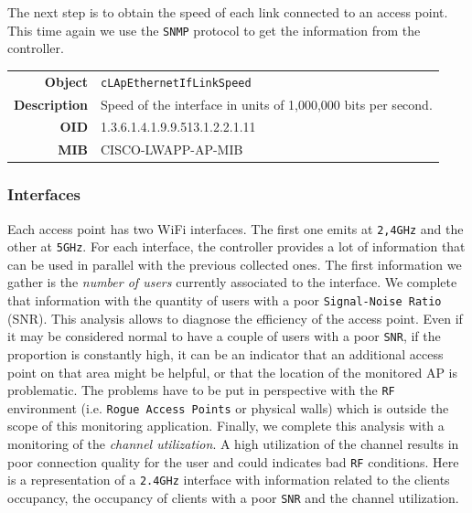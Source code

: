 The next step is to obtain the speed of each link connected to an access point. This time again we use the \texttt{SNMP} protocol to get the information from the controller.

\begin{tabular}{|r l|}
\hline
\textbf{Object} & \texttt{cLApEthernetIfLinkSpeed} \\
\textbf{Description} & \parbox{11cm}{Speed of the interface in units of 1,000,000 bits per second.} \\
\textbf{OID} & 1.3.6.1.4.1.9.9.513.1.2.2.1.11 \\
\textbf{MIB} & CISCO-LWAPP-AP-MIB \\
\hline
\end{tabular} 

\subsubsection*{Interfaces}
Each access point has two WiFi interfaces. The first one emits at \texttt{2,4GHz} and the other at \texttt{5GHz}. For each interface, the controller provides a lot of information that can be used in parallel with the previous collected ones. The first information we gather is the \textit{number of users} currently associated to the interface. We complete that information with the quantity of users with a poor \texttt{Signal-Noise Ratio} (SNR). This analysis allows to diagnose the efficiency of the access point. Even if it may be considered normal to have a couple of users with a poor \texttt{SNR}, if the proportion is constantly high, it can be an indicator that an additional access point on that area might be helpful, or that the location of the monitored AP is problematic. The problems have to be put in perspective with the \texttt{RF} environment (i.e. \texttt{Rogue Access Points} or physical walls) which is outside the scope of this monitoring application. 
Finally, we complete this analysis with a monitoring of the \emph{channel utilization}. A high utilization of the channel results in poor connection quality for the user and could indicates bad \texttt{RF} conditions.
Here is a representation of a \texttt{2.4GHz} interface with information related to the clients occupancy, the occupancy of clients with a poor \texttt{SNR} and the channel utilization. 

